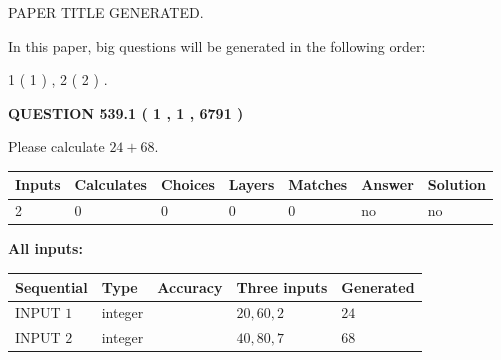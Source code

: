 \documentclass[12pt]{article}
\begin{document}
   
\vspace{0.2in}
   
   
   
   
   
   
   
   
 \vspace{0.2in}
 
 
 
 
   
   
 PAPER TITLE GENERATED.
   
   
   
\vspace{0.2in}
   
In this paper, big questions will be generated in the following order: 
   
   
   1 ( 1 )
 ,
   2 ( 2 )
 .
  
\vspace{0.2in}
  
{\textbf{\Large{QUESTION
539.1 
 ( 1 , 1 , 6791 )
}}}
  
  
 
Please calculate $ %
24 +  %
68 $.
 
 
   
   
   
   
\noindent\begin{tabular}{|l|l|l|l|l|l|l|}
 \hline
Inputs & Calculates & Choices & Layers & Matches & Answer & Solution \\ \hline
 2  & 
 0  & 
 0
  & 
 0  & 
 0  & 
  no & 
  no 
  \\ \hline
 \end{tabular}
   
   
   
   
\noindent{}
   
   
   
   
\noindent\vspace{0.1in}\hspace{-0.08in} {\textbf{\Large{All inputs: }}}
   
   
  
  
\noindent\begin{tabular}{|l|l|l|l|l|}
\hline
 Sequential & Type & Accuracy & Three inputs & Generated \\ 
\hline
 
 
  INPUT $  1 $ & integer &  & $
 20
 , 
 60
 , 
 2
 $ & $ 24 $ 
 \\  \hline  
 
 
  INPUT $  2 $ & integer &  & $
 40
 , 
 80
 , 
 7
 $ & $ 68 $ 
 \\  \hline  
 \end{tabular}
   
\end{document}
